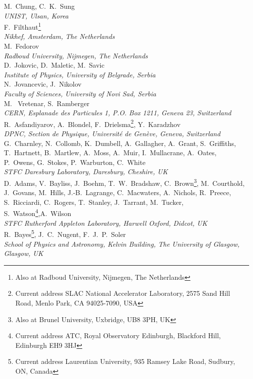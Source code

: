M.~Chung, C.~K.~Sung
\\{\it 
UNIST, Ulsan, Korea
}\\

F.~Filthaut\footnote{Also at Radboud University, Nijmegen, The Netherlands}
\\{\it
Nikhef, Amsterdam, The Netherlands
}\\

M.~Fedorov
\\{\it
Radboud University, Nijmegen, The Netherlands
}\\

D.~Jokovic, D.~Maletic, M.~Savic
\\{\it
Institute of Physics, University of Belgrade, Serbia
}\\

N.~Jovancevic, J.~Nikolov
\\{\it
Faculty of Sciences,  University of Novi Sad,  Serbia
}\\

M. ~Vretenar, S.~Ramberger
\\{\it
CERN, Esplanade des Particules 1, P.O. Box 1211, Geneva 23, Switzerland
}\\

R.~Asfandiyarov, A.~Blondel, F.~Drielsma\footnote{Current address SLAC National Accelerator Laboratory, 2575 Sand Hill Road, Menlo Park, CA 94025-7090, USA}, Y.~Karadzhov 
\\{\it
DPNC, Section de Physique, Universit\'e de Gen\`eve, Geneva, Switzerland
}\\

G.~Charnley, N.~Collomb,  K.~Dumbell, A.~Gallagher, A.~Grant, S.~Griffiths,  T.~Hartnett, B.~Martlew, 
A.~Moss, A.~Muir, I.~Mullacrane, A.~Oates, P.~Owens, G.~Stokes, P.~Warburton, C.~White
\\{\it
STFC Daresbury Laboratory, Daresbury, Cheshire, UK
}\\

D.~Adams,   V.~Bayliss, J.~Boehm, T.~W.~Bradshaw, C.~Brown\footnote{Also at Brunel University, Uxbridge, UB8 3PH, UK}, M.~Courthold,  J.~Govans, M.~Hills, J.-B.~Lagrange, C.~Macwaters, A.~Nichols, R.~Preece, S.~Ricciardi, C.~Rogers, T.~Stanley, J.~Tarrant,  
M.~Tucker, S.~Watson\footnote{Current address ATC, Royal Observatory Edinburgh, Blackford Hill,  Edinburgh EH9 3HJ},A.~Wilson
\\{\it
 STFC Rutherford Appleton Laboratory, Harwell Oxford, Didcot, UK
}\\

R.~Bayes\footnote{Current address Laurentian University, 935 Ramsey Lake Road, Sudbury, ON, Canada},  J.~C.~Nugent, F.~J.~P.~Soler
\\{\it
School of Physics and Astronomy, Kelvin Building, The University of Glasgow, Glasgow, UK
}\\

